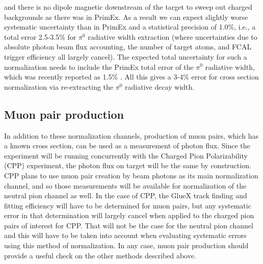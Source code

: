 and there is no dipole magnetic downstream of the target to sweep out
charged backgrounds as there was in PrimEx. As a result we can expect
slightly worse systematic
uncertainty than in PrimEx and a statistical precision of 1.0\%,
i.e., a total error 2.5-3.5\% for $\pi^0$ radiative width extraction
(where uncertainties due to absolute photon beam flux accounting,
the number of target atoms,
and FCAL trigger efficiency all largely cancel).
The expected total
uncertainty for such a normalization needs to include the PrimEx
total error of the $\pi^0$ radiative width, which was recently
reported as 1.5\% \cite{Larin:2018}.  All this gives a 3-4\%
error for cross section normalization via re-extracting the $\pi^0$
radiative decay width.

\subsection{Muon pair production}
In addition to these normalization channels, production of muon pairs,
which has a known cross section, can be used as a measurement of
photon flux. Since the experiment will be running concurrently with
the Charged Pion Polarizability (CPP) experiment, the photon flux on
target will be the same by construction. CPP plans to use muon pair
creation by beam photons as its main normalization channel, and so
those measurements will be available for normalization of the neutral
pion channel as well. In the case of CPP, the GlueX track finding and
fitting efficiency will have to be determined for muon pairs, but any
systematic error in that determination will largely cancel when
applied to the charged pion pairs of interest for CPP.
That will not be the case for the
neutral pion channel and this will have to be taken into account when
evaluating systematic errors using this method of normalization. In
any case, muon pair production should provide a useful check on the
other methods described above.
